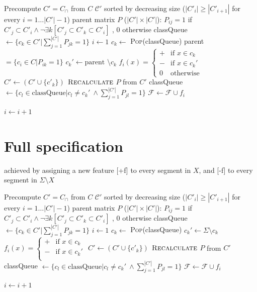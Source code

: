 \documentclass[11pt, oneside]{article}   	%
\begin{document}
\vspace{\baselineskip} \noindent \begin{algorithmic}
	\REQUIRE Precompute $C' = C_\cap$ from $C$
	\REQUIRE $\mathcal C'$ sorted by decreasing size ($|C'_i| \geq |C'_{i+1}| $ for every $i = 1 \ldots |C'|-1$)
	\REQUIRE parent matrix $P$ ($|C'| \times |C'|$): $P_{ij} = 1$ if $C'_j \subset C'_i \land \neg \exists k [C'_j \subset C'_k \subset C'_i]$ , $0$ otherwise
	\STATE
	\STATE classQueue $\leftarrow \{c_k \in C' | \sum_{j=1}^{|C'|}P_{jk} = 1 \}$
	\STATE $i \leftarrow 1$
	\STATE
	\STATE $c_k \leftarrow$ \textsc{Pop}(classQueue)
	\STATE parent $ = \{c_i \in C | P_{ik} = 1\}$
	\STATE $c_k' \leftarrow \mbox{parent } \setminus c_k$
	\STATE $f_i(x) = \begin{cases}
	+ & \mbox{if } x \in c_k \\
	- & \mbox{if } x \in c_k' \\
	0 & \mbox{otherwise}
	\end{cases} $
	\STATE $C' \leftarrow (C' \cup \{c'_k\})$
	\STATE $\textsc{Recalculate}$ $ P $ from $C'$
	\STATE classQueue $\leftarrow \{c_l \in \mbox{classQueue} | c_l \not= c_k' \ \land \sum_{j=1}^{|C'|}P_{jl} = 1 \}$
	\STATE $\mathcal F \leftarrow \mathcal F \cup f_i$
	
	\STATE $i \leftarrow i + 1$
	\ENDWHILE
\end{algorithmic}

\section{Full specification}
achieved by assigning a new feature [+f] to every segment in $X$, and [-f] to every segment in $\Sigma \setminus X$

\vspace{\baselineskip} \noindent \begin{algorithmic}
	\REQUIRE Precompute $C' = C_\cap$ from $C$
	\REQUIRE $\mathcal C'$ sorted by decreasing size ($|C'_i| \geq |C'_{i+1}| $ for every $i = 1 \ldots |C'|-1$)
	\REQUIRE parent matrix $P$ ($|C'| \times |C'|$): $P_{ij} = 1$ if $C'_j \subset C'_i \land \neg \exists k [C'_j \subset C'_k \subset C'_i]$ , $0$ otherwise
	\STATE
	\STATE classQueue $\leftarrow \{c_k \in C' | \sum_{j=1}^{|C'|}P_{jk} = 1 \}$
	\STATE $i \leftarrow 1$
	\STATE
	\STATE $c_k \leftarrow$ \textsc{Pop}(classQueue)
	\STATE $c_k' \leftarrow \Sigma \setminus c_k$
	\STATE $f_i(x) = \begin{cases}
	+ & \mbox{if } x \in c_k \\
	- & \mbox{if } x \in c_k' \\
	\end{cases} $
	\STATE $C' \leftarrow (C' \cup \{c'_k\})$
	\STATE $\textsc{Recalculate}$ $ P $ from $C'$
	\STATE classQueue $\leftarrow \{c_l \in \mbox{classQueue} | c_l \not= c_k' \ \land \sum_{j=1}^{|C'|}P_{jl} = 1 \}$
	\STATE $\mathcal F \leftarrow \mathcal F \cup f_i$
	
	\STATE $i \leftarrow i + 1$
	\ENDWHILE
\end{algorithmic}
\end{document}
